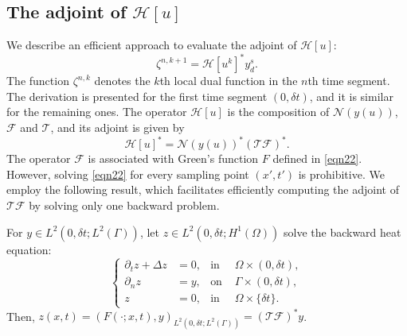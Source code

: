 \documentclass[onefignum,onetabnum]{siamart190516}
\numberwithin{equation}{section}
\begin{document}
\subsection{The adjoint of $\mathcal{H}[u]$}\label{subsec:ahu}
We describe an efficient approach to evaluate the adjoint of $\mathcal{H}[u]$:
\begin{equation*}
\zeta^{n,k+1} = \mathcal{H}[u^{k}]^{*} y^{s}_{d}.
\end{equation*}
The function $\zeta^{n,k}$ denotes the $k$th local dual function in the $n$th time segment.
The derivation is presented for the first time segment $(0, \delta t)$, and it is similar for the remaining ones.
The operator $\mathcal{H}[u]$ is the composition of $\mathcal{N}(y(u))$, $\mathcal{F}$ and $\mathcal{T}$, and its adjoint is given by
\begin{equation*}
\mathcal{H}[u]^* = \mathcal{N}(y(u))^* \left(\mathcal{T}\mathcal{F}\right)^*.
\end{equation*}
The operator $\mathcal{F}$ is associated with Green's function $F$ defined in \eqref{eqn22}.
However, solving
\eqref{eqn22} for every sampling point $(x',t')$ is prohibitive.
We employ the following result, which facilitates efficiently computing the adjoint of $\mathcal{T}\mathcal{F}$ by solving only one backward problem.
\begin{lemma}\label{lemma1}
For $y \in L^{2}(0, \delta t; L^{2}(\Gamma))$, let $z\in L^{2}(0,\delta t;H^{1}(\Omega))$ solve the backward heat equation:
\begin{equation}\label{eqn5}
\left\{
\begin{aligned}
\partial_{t} z + \Delta z &= 0, & \text{in }& \Omega \times (0, \delta t), \\
{\partial_n} z &= y, & \text{on }& \Gamma \times (0, \delta t), \\
z &= 0, & \text{in }& \Omega \times \{\delta t\}.
\end{aligned}
\right.
\end{equation}
Then, $z(x, t) = ( F(\cdot; x, t), y )_{L^{2}(0, \delta t; L^{2}(\Gamma))} = (\mathcal{T}\mathcal{F})^{*} y$.
\end{lemma}
\end{document}
